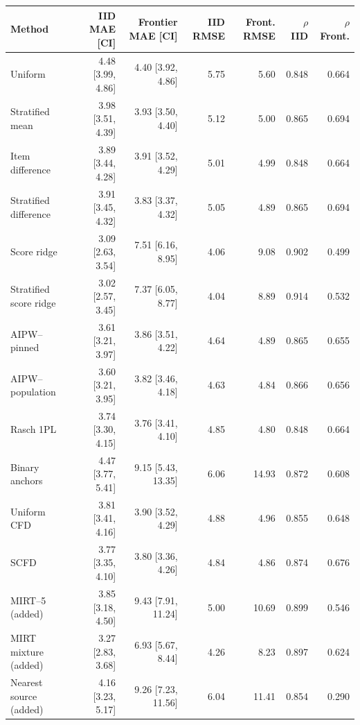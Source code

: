 \begin{tabular}{lrrrrrr}
\toprule
Method & IID MAE [CI] & Frontier MAE [CI] & IID RMSE & Front. RMSE & $\rho$ IID & $\rho$ Front. \\
\midrule
Uniform & 4.48 [3.99, 4.86] & 4.40 [3.92, 4.86] & 5.75 & 5.60 & 0.848 & 0.664 \\
Stratified mean & 3.98 [3.51, 4.39] & 3.93 [3.50, 4.40] & 5.12 & 5.00 & 0.865 & 0.694 \\
Item difference & 3.89 [3.44, 4.28] & 3.91 [3.52, 4.29] & 5.01 & 4.99 & 0.848 & 0.664 \\
Stratified difference & 3.91 [3.45, 4.32] & 3.83 [3.37, 4.32] & 5.05 & 4.89 & 0.865 & 0.694 \\
Score ridge & 3.09 [2.63, 3.54] & 7.51 [6.16, 8.95] & 4.06 & 9.08 & 0.902 & 0.499 \\
Stratified score ridge & 3.02 [2.57, 3.45] & 7.37 [6.05, 8.77] & 4.04 & 8.89 & 0.914 & 0.532 \\
AIPW--pinned & 3.61 [3.21, 3.97] & 3.86 [3.51, 4.22] & 4.64 & 4.89 & 0.865 & 0.655 \\
AIPW--population & 3.60 [3.21, 3.95] & 3.82 [3.46, 4.18] & 4.63 & 4.84 & 0.866 & 0.656 \\
Rasch 1PL & 3.74 [3.30, 4.15] & 3.76 [3.41, 4.10] & 4.85 & 4.80 & 0.848 & 0.664 \\
Binary anchors & 4.47 [3.77, 5.41] & 9.15 [5.43, 13.35] & 6.06 & 14.93 & 0.872 & 0.608 \\
Uniform CFD & 3.81 [3.41, 4.16] & 3.90 [3.52, 4.29] & 4.88 & 4.96 & 0.855 & 0.648 \\
SCFD & 3.77 [3.35, 4.10] & 3.80 [3.36, 4.26] & 4.84 & 4.86 & 0.874 & 0.676 \\
MIRT--5 (added) & 3.85 [3.18, 4.50] & 9.43 [7.91, 11.24] & 5.00 & 10.69 & 0.899 & 0.546 \\
MIRT mixture (added) & 3.27 [2.83, 3.68] & 6.93 [5.67, 8.44] & 4.26 & 8.23 & 0.897 & 0.624 \\
Nearest source (added) & 4.16 [3.23, 5.17] & 9.26 [7.23, 11.56] & 6.04 & 11.41 & 0.854 & 0.290 \\
\bottomrule
\end{tabular}
